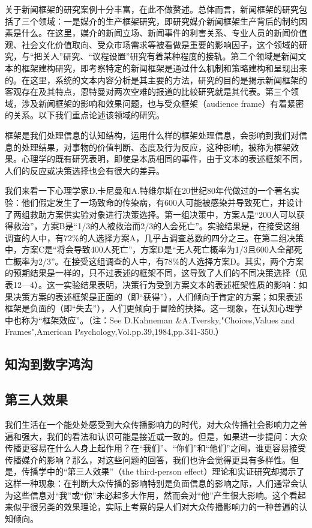\documentclass[UTF8,12pt]{ctexart}
\numberwithin{equation}{section} %
\numberwithin{figure}{section}
\numberwithin{table}{section}
\begin{document}
	关于新闻框架的研究案例十分丰富，在此不做赘述。总体而言，新闻框架的研究包括了三个领域：一是媒介的生产框架研究，即研究媒介新闻框架生产背后的制约因素是什么。在这里，媒介的新闻立场、新闻事件的利害关系、专业人员的新闻价值观、社会文化价值取向、受众市场需求等被看做是重要的影响因子，这个领域的研究，与“把关人”研究、“议程设置”研究有着某种程度的接轨。第二个领域是新闻文本的框架建构研究，即考察特定的新闻框架是通过什么机制和策略建构和呈现出来的。在这里，系统的文本内容分析是其主要的方法，研究的目的是揭示新闻框架的客观存在及其特点，恩特曼对两次空难的报道的比较研究就是其代表。第三个领域，涉及新闻框架的影响和效果问题，也与受众框架（audience frame）有着紧密的关系。以下我们重点论述该领域的研究。
	
	框架是我们处理信息的认知结构，运用什么样的框架处理信息，会影响到我们对信息的处理结果，对事物的价值判断、态度及行为反应，这种影响，被称为框架效果。心理学的既有研究表明，即使是本质相同的事件，由于文本的表述框架不同，人们的反应或决策选择也会有很大的差异。
	
	我们来看一下心理学家D.卡尼曼和A.特维尔斯在20世纪80年代做过的一个著名实验：他们假定发生了一场致命的传染病，有600人可能被感染并导致死亡，并设计了两组救助方案供实验对象进行决策选择。第一组决策中，方案A是“200人可以获得救治”，方案B是“1/3的人被救治而2/3的人会死亡”。实验结果是，在接受这组调查的人中，有72\%的人选择方案A，几乎占调查总数的四分之三。在第二组决策中，方案C是“将会导致400人死亡”，方案D是“无人死亡概率为1/3且600人全部死亡概率为2/3”。在接受这组调查的人中，有78\%的人选择方案D。其实，两个方案的预期结果是一样的，只不过表述的框架不同，这导致了人们的不同决策选择（见表12—4）。这一实验结果表明，决策行为受到方案文本的表述框架性质的影响：如果决策方案的表述框架是正面的（即“获得”），人们倾向于肯定的方案；如果表述框架是负面的（即“失去”），人们更倾向于冒险的抉择。这一现象，在认知心理学中也称为“框架效应”。（注：See D.Kahneman \&A.Tversky,"Choices,Values and Frames",American Psychology,Vol.pp.39,1984,pp.341-350.）
	
	\subsection{知沟到数字鸿沟}
	
	\subsection{第三人效果}
	我们生活在一个能处处感受到大众传播影响力的时代，对大众传播社会影响力之普遍和强大，我们的看法和认识可能是接近或一致的。但是，如果进一步提问：大众传播更容易在什么人身上起作用？在“我们”、“你们”和“他们”之间，谁更容易接受传播媒介的影响？那么，对这些问题的回答，我们也许会觉得更具有多样性。但是，传播学中的“第三人效果”（the third-person effect）理论和实证研究却揭示了这样一种现象：在判断大众传播的影响特别是负面信息的影响之际，人们通常会认为这些信息对“我”或“你”未必起多大作用，然而会对“他”产生很大影响。这个看起来似乎很另类的效果理论，实际上考察的是人们对大众传播影响力的一种普遍的认知倾向。
	
\end{document}
